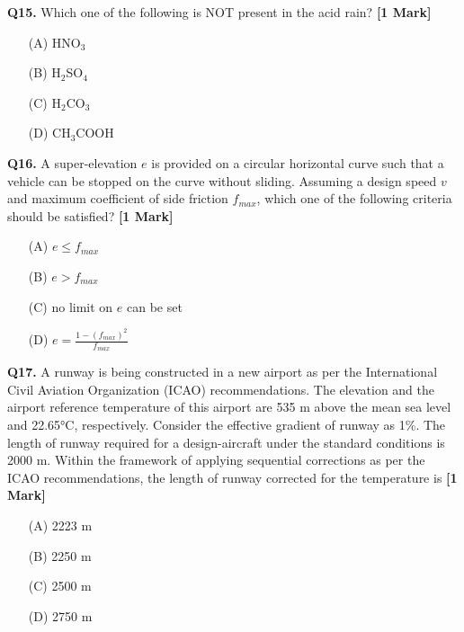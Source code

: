 \documentclass[11pt]{article}
\newcommand{\questiona}[2]{
    \noindent\textbf{Q#2.} #1 \hfill \textbf{[1 Mark]}
}
\begin{document}
\vspace{0.5cm}

\questiona{Which one of the following is NOT present in the acid rain?}{15}
\begin{enumerate}
    \item[(A)] HNO$_3$
    \item[(B)] H$_2$SO$_4$
    \item[(C)] H$_2$CO$_3$
    \item[(D)] CH$_3$COOH
\end{enumerate}

\vspace{0.5cm}

\questiona{A super-elevation $e$ is provided on a circular horizontal curve such that a vehicle can be stopped on the curve without sliding. Assuming a design speed $v$ and maximum coefficient of side friction $f_{max}$, which one of the following criteria should be satisfied?}{16}
\begin{enumerate}
    \item[(A)] $e \leq f_{max}$
    \item[(B)] $e > f_{max}$
    \item[(C)] no limit on $e$ can be set
    \item[(D)] $e = \frac{1 - (f_{max})^2}{f_{max}}$
\end{enumerate}

\vspace{0.5cm}

\questiona{A runway is being constructed in a new airport as per the International Civil Aviation Organization (ICAO) recommendations. The elevation and the airport reference temperature of this airport are 535 m above the mean sea level and 22.65°C, respectively. Consider the effective gradient of runway as 1\%. The length of runway required for a design-aircraft under the standard conditions is 2000 m. Within the framework of applying sequential corrections as per the ICAO recommendations, the length of runway corrected for the temperature is}{17}
\begin{enumerate}
    \item[(A)] 2223 m
    \item[(B)] 2250 m
    \item[(C)] 2500 m
    \item[(D)] 2750 m
\end{enumerate}

\vspace{0.5cm}
\end{document}
